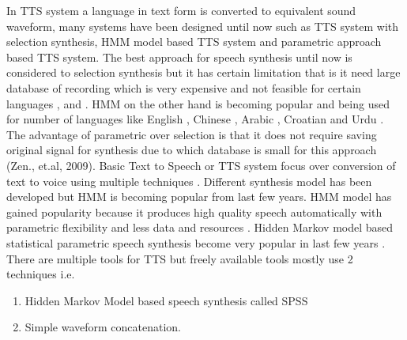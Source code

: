 In TTS system a language in text form is converted to equivalent sound waveform, many systems have been designed until
now such as TTS system with selection synthesis, HMM model based TTS system and parametric approach based TTS
system. The best approach for speech synthesis until now is considered to selection synthesis but it has certain limitation that
is it need large database of recording which is very expensive and not feasible for certain languages \cite{black1994chatr}, \cite{hunt1996unit} and 
\cite{black2003unit}. HMM on the other hand is becoming popular and being used for number of languages like English \cite{tokuda2002hmm}, Chinese \cite{qian2006hmm}, 
Arabic \cite{abdel2006improving}, Croatian \cite{martincic2006croatian} and
Urdu \cite{ahmed2014hmm}. The advantage of parametric over selection is that it does not require saving original signal for
synthesis due to which database is small for this approach (Zen., et.al, 2009). Basic Text to Speech or TTS system focus over
conversion of text to voice using multiple techniques \cite{merritt2013investigating}. Different synthesis model has been
developed but HMM is becoming popular from last few years. HMM model has gained popularity because it produces high
quality speech automatically with parametric flexibility and less data and resources \cite{black2007statistical}. Hidden
Markov model based statistical parametric speech synthesis become very popular in last few years \cite{ze2013statistical}. There
are multiple tools for TTS but freely available tools mostly use 2 techniques i.e.

\begin{enumerate}
	\item Hidden Markov Model based speech synthesis called SPSS
	\item Simple waveform concatenation.
\end{enumerate}

